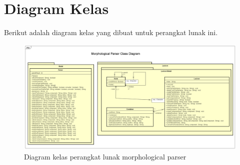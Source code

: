 \section{Diagram Kelas}
\label{sec:DiagramKelasAwal}

Berikut adalah diagram kelas yang dibuat untuk perangkat lunak ini.

\begin{figure}[H]
\centering
\includegraphics[scale=0.3]{Gambar/gambar-diagram-kelas-awal}
\caption[Diagram kelas perangkat lunak morphological parser]{Diagram kelas perangkat lunak morphological parser} 
\label{gambar-diagram-kelas-awal}
\end{figure}